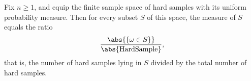 \begin{theorem}
\label{CommunicationComplexity.Functions.Disjointness.RandomizedLowerBound.measureReal_eq_card_subtype_div}
\leanok
{}
Fix $n \ge 1$, and equip the finite sample space of hard samples with its uniform
probability measure. Then for every subset $S$ of this space, the measure of $S$ equals
the ratio
\[
\frac{\abs{\{\omega \in S\}}}{\abs{\text{HardSample}}},
\]
that is, the number of hard samples lying in $S$ divided by the total number of hard
samples.
\end{theorem}

